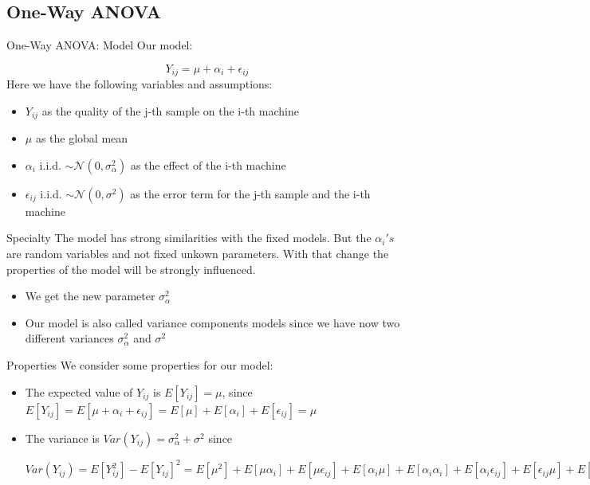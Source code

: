 \documentclass[unknownkeysallowed]{beamer}
\begin{document}
\subsection{One-Way ANOVA}
\begin{frame}{One-Way ANOVA: Model}
Our model:

$$
Y_{ij} = \mu + \alpha_i + \epsilon_{ij}
$$
Here we have the following variables and assumptions:
\begin{itemize}
    \item $Y_{ij}$ as the quality of the j-th sample on the i-th machine 
    \item $\mu$ as the global mean
    \item $\alpha_i$ i.i.d.  
    $\sim \mathcal{N}(0,\sigma^2_{\alpha})$ as the effect of the i-th machine
    \item $\epsilon_{ij}$ i.i.d. $\sim \mathcal{N}(0,\sigma^2)$ as the error term for the j-th sample and the i-th machine
\end{itemize}
\end{frame}

\begin{frame}{Specialty}
    The model has strong similarities with the fixed models. But the $\alpha_i's$ are random variables and not fixed unkown parameters.
    With that change the properties of the model will be strongly influenced.
    \begin{itemize}
        \item We get the new parameter $\sigma^2_{\alpha}$
        \item Our model is also called variance components models since we have now two different variances $\sigma^2_{\alpha}$ and $\sigma^2$
    \end{itemize}
\end{frame}

\begin{frame}{Properties}
    We consider some properties for our model:
    \begin{itemize}
        \item The expected value of $Y_{ij}$ is $E[Y_{ij}]=\mu$, since $E[Y_{ij}] = E[\mu + \alpha_i + \epsilon_{ij}] = E[\mu] + E[\alpha_i] + E[\epsilon_{ij}] = \mu$
        \item The variance is $Var(Y_{ij}) = \sigma^2_{\alpha} +\sigma^2$ since
        
        $Var(Y_{ij}) = E[Y_{ij}^2] - E[Y_{ij}]^2
        = E[\mu^2] + E[\mu \alpha_i] + E[\mu \epsilon_{ij}] + E[\alpha_i \mu] + E[\alpha_i \alpha_i] + E[\alpha_i \epsilon_{ij}] + E[\epsilon_{ij} \mu] + E[\epsilon_{ij}\alpha_i] + E[\epsilon_{ij}\epsilon_{ij}] - \mu^2
        = \mu^2 + \mu \underbrace{E[\alpha_i]}_\text{= 0} + \mu \underbrace{E[\epsilon_{ij}]}_\text{= 0} + \underbrace{E[\alpha_i]}_\text{=0}\mu + E[\alpha_i^2] + \underbrace{E[\alpha_i]}_\text{= 0}\underbrace{E[\epsilon_{ij}]}_\text{= 0} + \underbrace{E[\epsilon_{ij}]}_\text{=0}\mu + \underbrace{E[\epsilon_{ij}]}_\text{=0} \underbrace{E[\alpha_i]}_\text{=0} + E[\epsilon_{ij}^2] - \mu^2 
        = E[\alpha_i^2] + E[\epsilon_{ij}^2]
        = \sigma^2_{\alpha} + \sigma^2$
    \end{itemize}
\end{frame}
\end{document}

